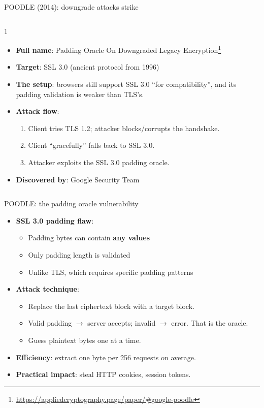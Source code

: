 \ifdefined\PRESENTATION\else\PassOptionsToClass{handout}{beamer}\fi\documentclass[aspectratio=169, lualatex]{beamer}
\begin{document}
\begin{frame}{POODLE (2014): downgrade attacks strike}
	\begin{columns}[c]
		\begin{column}{1\textwidth}
			\begin{itemize}
				\item \textbf{Full name}: Padding Oracle On Downgraded Legacy Encryption\footnote{\url{https://appliedcryptography.page/paper/\#google-poodle}}
				\item \textbf{Target}: SSL 3.0 (ancient protocol from 1996)
				\item \textbf{The setup}: browsers still support SSL 3.0 ``for compatibility'', and its padding validation is weaker than TLS's.
				\item \textbf{Attack flow}:
				      \begin{enumerate}
					      \item Client tries TLS 1.2; attacker blocks/corrupts the handshake.
					      \item Client ``gracefully'' falls back to SSL 3.0.
					      \item Attacker exploits the SSL 3.0 padding oracle.
				      \end{enumerate}
				\item \textbf{Discovered by}: Google Security Team
			\end{itemize}
		\end{column}
	\end{columns}
\end{frame}

\begin{frame}{POODLE: the padding oracle vulnerability}
	\begin{itemize}
		\item \textbf{SSL 3.0 padding flaw}:
		      \begin{itemize}
			      \item Padding bytes can contain \textbf{any values}
			      \item Only padding length is validated
			      \item Unlike TLS, which requires specific padding patterns
		      \end{itemize}
		\item \textbf{Attack technique}:
		      \begin{itemize}
			      \item Replace the last ciphertext block with a target block.
			      \item Valid padding $\rightarrow$ server accepts; invalid $\rightarrow$ error. That is the oracle.
			      \item Guess plaintext bytes one at a time.
		      \end{itemize}
		\item \textbf{Efficiency}: extract one byte per 256 requests on average.
		\item \textbf{Practical impact}: steal HTTP cookies, session tokens.
	\end{itemize}
\end{frame}
\end{document}
